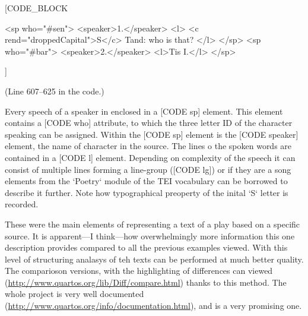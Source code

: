 \documentclass{article}
\begin{document}
[CODE_BLOCK

<sp who="#sen">
	<speaker>1.</speaker>
	<l>
		<c rend="droppedCapital">S</c>
		Tand: who is that?
	</l>
</sp>
<sp who="#bar">
	<speaker>2.</speaker>
		<l>Tis I.</l>
</sp>

]

(Line 607--625 in the code.)

Every speech of a speaker in enclosed in a [CODE sp] element. This element contains a [CODE who] attribute, to which the three letter ID of the character speaking can be assigned. Within the [CODE sp] element is the [CODE speaker] element, the name of character in the source. The lines o the spoken words are contained in a [CODE l] element. Depending on complexity of the speech it can consist of multiple lines forming a line-group ([CODE lg]) or if they are a song elements from the `Poetry` module of the TEI vocabulary can be borrowed to describe it further. Note how typographical preoperty of the inital `S` letter is recorded.

These were the main elements of representing a text of a play based on a specific source. It is apparent---I think---how overwhelmingly more information this one description provides compared to all the previous examples viewed. With this level of structuring analasys of teh texts can be performed at much better quality. The comparioson versions, with the highlighting of differences can viewed (\url{http://www.quartos.org/lib/Diff/compare.html}) thanks to this method.
The whole project is very well documented (\url{http://www.quartos.org/info/documentation.html}), and is a very promising one.   
\end{document}
